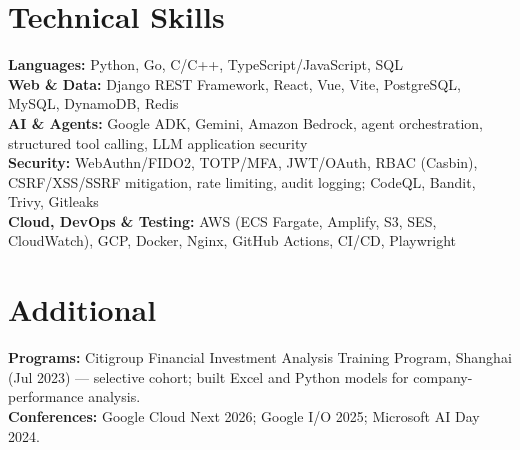 \documentclass[10pt,letterpaper]{article}
\begin{document}
\section{Technical Skills}
{\small
\textbf{Languages:} Python, Go, C/C++, TypeScript/JavaScript, SQL \\
\textbf{Web \& Data:} Django REST Framework, React, Vue, Vite, PostgreSQL, MySQL, DynamoDB, Redis \\
\textbf{AI \& Agents:} Google ADK, Gemini, Amazon Bedrock, agent orchestration, structured tool calling, LLM application security \\
\textbf{Security:} WebAuthn/FIDO2, TOTP/MFA, JWT/OAuth, RBAC (Casbin), CSRF/XSS/SSRF mitigation, rate limiting, audit logging; CodeQL, Bandit, Trivy, Gitleaks \\
\textbf{Cloud, DevOps \& Testing:} AWS (ECS Fargate, Amplify, S3, SES, CloudWatch), GCP, Docker, Nginx, GitHub Actions, CI/CD, Playwright
}

\section{Additional}
{\small
\textbf{Programs:} Citigroup Financial Investment Analysis Training Program, Shanghai (Jul 2023) --- selective cohort; built Excel and Python models for company-performance analysis. \\[2pt]
\textbf{Conferences:} Google Cloud Next 2026; Google I/O 2025; Microsoft AI Day 2024.
}
\end{document}
